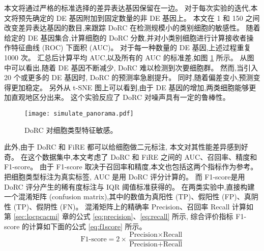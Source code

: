 本文将通过严格的标准选择的差异表达基因保留在一边。
对于每次实验的迭代,本文将预先确定的 DE 基因附加到固定数量的非 DE 基因上。
本文在 1 和 150 之间改变差异表达基因的数目,来跟踪 DoRC 在检测规模小的类别细胞的敏感性。
随着给定的 DE 基因集合,计算细胞的 DoRC 分数,并对小类别细胞进行计算接收者操作特征曲线 (ROC) 下面积 (AUC)。
对于每一种数量的 DE 基因,上述过程重复 1000 次。
汇总后计算平均 AUC,以及所有的 AUC 的标准差,如图 \ref{fig:simulate:roc} 所示。
从图中可以看出,随着 DE 基因不断减少, DoRC 难以检测到次要细胞群。
然而,当引入 20 个或更多的 DE 基因时, DoRC 的预测率急剧提升。
同时,随着偏差变小,预测变得更加稳定。
另外从 t-SNE 图上可以看到,由于 DE 基因的增加,两类细胞能够更加直观地区分出来。
这个实验反应了 DoRC 对噪声具有一定的鲁棒性。

\begin{figure}[!htbp]
    \centering
    \texttt{[image: simulate\_panorama.pdf]}
    \caption{
    DoRC 对细胞类型特征敏感。
    }
    \label{fig:simulate:roc}
\end{figure}

此外,由于 DoRC 和 FiRE 都可以给细胞做二元标注,
本文对其性能差异感到好奇。
在这个数据集中,本文考虑了 DoRC 和 FiRE 之间的 AUC、召回率、精度和 F1-score。
由于 F1-score 取决于召回率和精度,本文也包括这两个指标作为参考。
把细胞类型标注为真实标签, AUC 是用 DoRC 评分计算的。
而 F1-score是用 DoRC 评分产生的稀有度标注与 IQR 阈值标准获得的。
在两类实验中,直接构建一个混淆矩阵 (confusion matrix),其中的数值为真阳性 (TP)、假阳性 (FP)、真阴性 (TP)、假阴性 (FN)。
混淆矩阵上的精确率 Precision、召回率 Recall 计算如第 \ref{sec:locpcacmi} 章的公式 \ref{eq:precision}、\ref{eq:recall} 所示,
综合评价指标 F1-score 的计算如下面的公式 \ref{eq:f1score} 所示。
\begin{equation}
\label{eq:f1score}
\text{F1-score} = 2 \times \frac{\text{Precision} \times \text{Recall}}{ \text{Precision} + \text{Recall}}
\end{equation}

